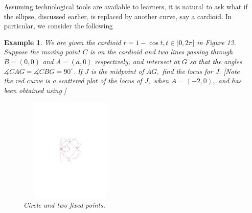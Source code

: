 \documentclass[12pt,a4paper]{article}%
\newtheorem{example}[theorem]{Example}
\begin{document}
Assuming technological tools are available to learners, it is natural to ask
what if the ellipse, discussed earlier, is replaced by another curve, say a
cardioid. In particular, we consider the following

\begin{example} \label{ex9}
We are given the cardioid $r=1-\cos t,t\in\lbrack0,2\pi]$ in Figure 13.
Suppose the moving point $C$ is on the cardioid and two lines passing through
$B=(0,0)$ and $A=(a,0)$ respectively, and intersect at $G$ so that the angles
$\measuredangle CAG=\measuredangle CBG=90^{\circ}$. If $J$ is the midpoint of
$AG,$ find the locus for $J.$ [Note the red curve is a scattered plot of the
locus of $J,$ when $A=\left(  -2,0\right)  ,$ and has been obtained using
\cite{CP}]%
\begin{figure}[htbp]
\begin{center}
 \includegraphics[natheight=2.841900in,natwidth=2.763800in,height=2.0427in,width=1.9868in]{Figure3.pdf}
\end{center}
 \caption{Circle and two fixed points.}
 \label{fig13}
\end{figure}

\end{example}
\end{document}
